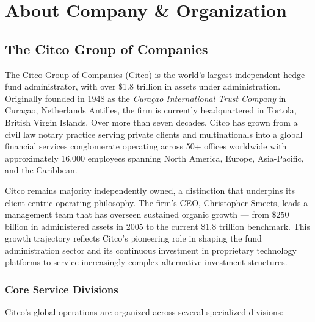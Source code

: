 \chapter{About Company \& Organization}
\label{chap:about_company}

\section{The Citco Group of Companies}

The Citco Group of Companies (Citco) is the world's largest independent hedge fund administrator, with over \$1.8 trillion in assets under administration. Originally founded in 1948 as the \textit{Curaçao International Trust Company} in Curaçao, Netherlands Antilles, the firm is currently headquartered in Tortola, British Virgin Islands. Over more than seven decades, Citco has grown from a civil law notary practice serving private clients and multinationals into a global financial services conglomerate operating across 50+ offices worldwide with approximately 16,000 employees spanning North America, Europe, Asia-Pacific, and the Caribbean.

Citco remains majority independently owned, a distinction that underpins its client-centric operating philosophy. The firm's CEO, Christopher Smeets, leads a management team that has overseen sustained organic growth --- from \$250 billion in administered assets in 2005 to the current \$1.8 trillion benchmark. This growth trajectory reflects Citco's pioneering role in shaping the fund administration sector and its continuous investment in proprietary technology platforms to service increasingly complex alternative investment structures.

\subsection{Core Service Divisions}

Citco's global operations are organized across several specialized divisions:

